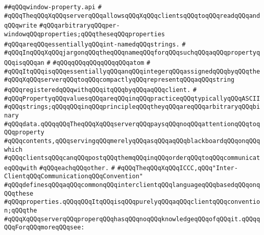 \label{src/lib/x-kit/xclient/src/iccc/window-property.api}
\verb|##qQQqwindow-property.api|\newline
\verb|#|\newline
\verb|#qQQqTheqQQqXqQQqserverqQQqallowsqQQqXqQQqclientsqQQqtoqQQqreadqQQqandqQQqwrite|\newline
\verb|#qQQqarbitraryqQQqper-windowqQQqproperties;qQQqtheseqQQqproperties|\newline
\verb|#qQQqareqQQqessentiallyqQQqint-namedqQQqstrings.|\newline
\verb|#|\newline
\verb|#qQQqInqQQqXqQQqjargonqQQqtheqQQqnameqQQqforqQQqsuchqQQqaqQQqpropertyqQQqisqQQqan|\newline
\verb|#|\newline
\verb|#qQQqqQQqqQQqqQQqqQQqatom|\newline
\verb|#|\newline
\verb|#qQQqItqQQqisqQQqessentiallyqQQqanqQQqintegerqQQqassignedqQQqbyqQQqthe|\newline
\verb|#qQQqXqQQqserverqQQqtoqQQqcompactlyqQQqrepresentqQQqaqQQqstring|\newline
\verb|#qQQqregisteredqQQqwithqQQqitqQQqbyqQQqaqQQqclient.|\newline
\verb|#|\newline
\verb|#qQQqPropertyqQQqvaluesqQQqareqQQqinqQQqpracticeqQQqtypicallyqQQqASCII|\newline
\verb|#qQQqstrings;qQQqqQQqinqQQqprincipleqQQqtheyqQQqareqQQqarbitraryqQQqbinary|\newline
\verb|#qQQqdata.qQQqqQQqTheqQQqXqQQqserverqQQqpaysqQQqnoqQQqattentionqQQqtoqQQqproperty|\newline
\verb|#qQQqcontents,qQQqservingqQQqmerelyqQQqasqQQqaqQQqblackboardqQQqonqQQqwhich|\newline
\verb|#qQQqclientsqQQqcanqQQqpostqQQqthemqQQqinqQQqorderqQQqtoqQQqcommunicateqQQqwith|\newline
\verb|#qQQqeachqQQqother.|\newline
\verb|#|\newline
\verb|#qQQqTheqQQqXqQQqICCC,qQQq"Inter-ClientqQQqCommunicationqQQqConvention"|\newline
\verb|#qQQqdefinesqQQqaqQQqcommonqQQqinterclientqQQqlanguageqQQqbasedqQQqonqQQqthese|\newline
\verb|#qQQqproperties.qQQqqQQqItqQQqisqQQqpurelyqQQqaqQQqclientqQQqconvention;qQQqthe|\newline
\verb|#qQQqXqQQqserverqQQqproperqQQqhasqQQqnoqQQqknowledgeqQQqofqQQqit.qQQqqQQqForqQQqmoreqQQqsee:|\newline
